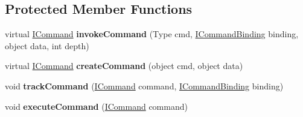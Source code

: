 \subsection*{Protected Member Functions}
\begin{DoxyCompactItemize}
\item 
\hypertarget{classstrange_1_1extensions_1_1command_1_1impl_1_1_command_binder_a6ac0eaf086a6425a54492846f858703d}{virtual \hyperlink{interfacestrange_1_1extensions_1_1command_1_1api_1_1_i_command}{I\-Command} {\bfseries invoke\-Command} (Type cmd, \hyperlink{interfacestrange_1_1extensions_1_1command_1_1api_1_1_i_command_binding}{I\-Command\-Binding} binding, object data, int depth)}\label{classstrange_1_1extensions_1_1command_1_1impl_1_1_command_binder_a6ac0eaf086a6425a54492846f858703d}

\item 
\hypertarget{classstrange_1_1extensions_1_1command_1_1impl_1_1_command_binder_afcde1b363255b70ed9f84c7f90d139d4}{virtual \hyperlink{interfacestrange_1_1extensions_1_1command_1_1api_1_1_i_command}{I\-Command} {\bfseries create\-Command} (object cmd, object data)}\label{classstrange_1_1extensions_1_1command_1_1impl_1_1_command_binder_afcde1b363255b70ed9f84c7f90d139d4}

\item 
\hypertarget{classstrange_1_1extensions_1_1command_1_1impl_1_1_command_binder_ac72e98df4d7b5c47d4f6514fd515f4ec}{void {\bfseries track\-Command} (\hyperlink{interfacestrange_1_1extensions_1_1command_1_1api_1_1_i_command}{I\-Command} command, \hyperlink{interfacestrange_1_1extensions_1_1command_1_1api_1_1_i_command_binding}{I\-Command\-Binding} binding)}\label{classstrange_1_1extensions_1_1command_1_1impl_1_1_command_binder_ac72e98df4d7b5c47d4f6514fd515f4ec}

\item 
\hypertarget{classstrange_1_1extensions_1_1command_1_1impl_1_1_command_binder_a31a0b6d3b5de1d9a8029ab8461fd46ee}{void {\bfseries execute\-Command} (\hyperlink{interfacestrange_1_1extensions_1_1command_1_1api_1_1_i_command}{I\-Command} command)}\label{classstrange_1_1extensions_1_1command_1_1impl_1_1_command_binder_a31a0b6d3b5de1d9a8029ab8461fd46ee}

\end{DoxyCompactItemize}
